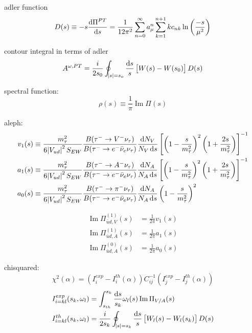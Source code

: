 \documentclass{article}
\begin{document}
  adler function
  \begin{equation}
    D(s) \equiv -s \frac{\dif \Pi^{PT}}{\dif s} = \frac{1}{12\pi^2}\sum_{n=0}^\infty a_\mu^n \sum_{k=1}^{n+1} k c_{nk} \ln\left( \frac{-s}{\mu^2} \right)
  \end{equation}

  contour integral in terms of adler
  \begin{equation}
    A^{\omega,PT} = \frac{i}{2 s_0} \oint_{\envert{s}=s_o} \frac{\dif s}{s} \left[ W(s) - W(s_0) \right] D(s)
  \end{equation}

  spectral function:
  \begin{equation}
    \rho(s) \equiv \frac{1}{\pi} \operatorname{Im}\Pi(s)
  \end{equation}
  
  aleph:
  \begin{equation}
    \begin{split}
      v_1(s) &\equiv \frac{m_\tau^2}{6 \envert{V_{ud}}^2S_{EW}} \frac{B(\tau^- \to V^- \nu_\tau)}{B(\tau^- \to e^- \bar \nu_e \nu_\tau)} \frac{\dif N_V}{N_V \dif s} \left[ \left( 1 - \frac{s}{m_\tau^2} \right)^2 \left( 1 + \frac{2 s}{m_\tau^2}\right) \right]^{-1} \\
      a_1(s) &\equiv \frac{m_\tau^2}{6 \envert{V_{ud}}^2S_{EW}} \frac{B(\tau^- \to A^- \nu_\tau)}{B(\tau^- \to e^- \bar \nu_e \nu_\tau)} \frac{\dif N_A}{N_A \dif s} \left[ \left( 1 - \frac{s}{m_\tau^2} \right)^2 \left( 1 + \frac{2 s}{m_\tau^2}\right) \right]^{-1} \\
      a_0(s) &\equiv \frac{m_\tau^2}{6 \envert{V_{ud}}^2S_{EW}} \frac{B(\tau^- \to \pi^- \nu_\tau)}{B(\tau^- \to e^- \bar \nu_e \nu_\tau)} \frac{\dif N_A}{N_A \dif s} \left( 1 - \frac{s}{m_\tau^2} \right)^2
    \end{split}
  \end{equation} 

  \begin{equation}
    \begin{split}
      \operatorname{Im} \Pi_{\bar u d,V}^{(1)}(s) &= \frac{1}{2\pi} v_1(s) \\
      \operatorname{Im} \Pi_{\bar u d,A}^{(1)}(s) &= \frac{1}{2\pi} a_1(s) \\
      \operatorname{Im} \Pi_{\bar u d,A}^{(0)}(s) &= \frac{1}{2\pi} a_0(s)
    \end{split}
  \end{equation}

  chisquared:
  \begin{equation}
    \chi^2(\alpha) = (I_i^{exp}-I_i^{th}(\alpha)) C_{ij}^{-1} (I_j^{exp}-I_j^{th}(\alpha))
  \end{equation}
  \begin{equation}
    \begin{split}
      I_{i=kl}^{exp}(s_k,\omega_l) &= \int_{s_{th}}^{s_k} \frac{\dif s}{s_k} \omega_l (s) \operatorname{Im} \Pi_{V/A}(s) \\
      I_{i=kl}^{th}(s_k,\omega_l) &= \frac{i}{2 s_k} \oint_{\envert{s}=s_k} \frac{\dif s}{s} \left[ W_l(s) - W_l(s_k) \right] D(s)
    \end{split}
  \end{equation} 
  
\end{document}

